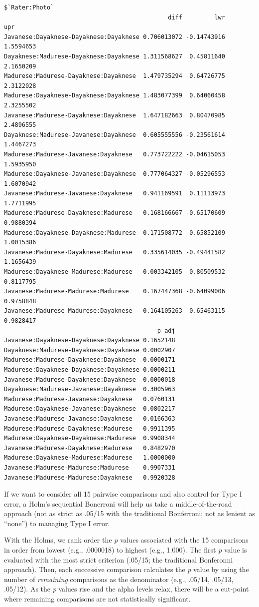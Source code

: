 \documentclass[
  11pt,
]{book}
\begin{document}
\begin{verbatim}
$`Rater:Photo`
                                              diff         lwr       upr
Javanese:Dayaknese-Dayaknese:Dayaknese 0.706013072 -0.14743916 1.5594653
Dayaknese:Madurese-Dayaknese:Dayaknese 1.311568627  0.45811640 2.1650209
Madurese:Madurese-Dayaknese:Dayaknese  1.479735294  0.64726775 2.3122028
Madurese:Dayaknese-Dayaknese:Dayaknese 1.483077399  0.64060458 2.3255502
Javanese:Madurese-Dayaknese:Dayaknese  1.647182663  0.80470985 2.4896555
Dayaknese:Madurese-Javanese:Dayaknese  0.605555556 -0.23561614 1.4467273
Madurese:Madurese-Javanese:Dayaknese   0.773722222 -0.04615053 1.5935950
Madurese:Dayaknese-Javanese:Dayaknese  0.777064327 -0.05296553 1.6070942
Javanese:Madurese-Javanese:Dayaknese   0.941169591  0.11113973 1.7711995
Madurese:Madurese-Dayaknese:Madurese   0.168166667 -0.65170609 0.9880394
Madurese:Dayaknese-Dayaknese:Madurese  0.171508772 -0.65852109 1.0015386
Javanese:Madurese-Dayaknese:Madurese   0.335614035 -0.49441582 1.1656439
Madurese:Dayaknese-Madurese:Madurese   0.003342105 -0.80509532 0.8117795
Javanese:Madurese-Madurese:Madurese    0.167447368 -0.64099006 0.9758848
Javanese:Madurese-Madurese:Dayaknese   0.164105263 -0.65463115 0.9828417
                                           p adj
Javanese:Dayaknese-Dayaknese:Dayaknese 0.1652148
Dayaknese:Madurese-Dayaknese:Dayaknese 0.0002907
Madurese:Madurese-Dayaknese:Dayaknese  0.0000171
Madurese:Dayaknese-Dayaknese:Dayaknese 0.0000211
Javanese:Madurese-Dayaknese:Dayaknese  0.0000018
Dayaknese:Madurese-Javanese:Dayaknese  0.3005963
Madurese:Madurese-Javanese:Dayaknese   0.0760131
Madurese:Dayaknese-Javanese:Dayaknese  0.0802217
Javanese:Madurese-Javanese:Dayaknese   0.0166363
Madurese:Madurese-Dayaknese:Madurese   0.9911395
Madurese:Dayaknese-Dayaknese:Madurese  0.9908344
Javanese:Madurese-Dayaknese:Madurese   0.8482970
Madurese:Dayaknese-Madurese:Madurese   1.0000000
Javanese:Madurese-Madurese:Madurese    0.9907331
Javanese:Madurese-Madurese:Dayaknese   0.9920328
\end{verbatim}

If we want to consider all 15 pairwise comparisons and also control for Type I error, a Holm's sequential Bonerroni \citep{green_using_2014} will help us take a middle-of-the-road approach (not as strict as .05/15 with the traditional Bonferroni; not as lenient as ``none'') to managing Type I error.

With the Holms, we rank order the \emph{p} values associated with the 15 comparisons in order from lowest (e.g., .0000018) to highest (e.g., 1.000). The first \emph{p} value is evaluated with the most strict criterion (.05/15; the traditional Bonferonni approach). Then, each successive comparison calculates the \emph{p} value by using the number of \emph{remaining} comparisons as the denominator (e.g., .05/14, .05/13, .05/12). As the \emph{p} values rise and the alpha levels relax, there will be a cut-point where remaining comparisons are not statistically significant.
\end{document}
